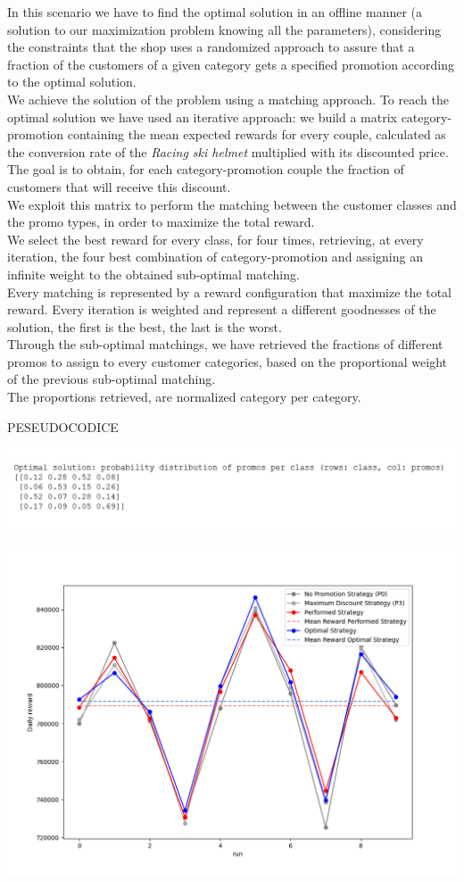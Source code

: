 In this scenario we have to find the optimal solution in an offline manner (a solution to our maximization problem knowing all the parameters), considering the constraints that the shop uses a randomized approach to assure that a fraction of the customers of a given category gets a specified promotion according to the optimal solution.\\
We achieve the solution of the problem using a matching approach. 
To reach the optimal solution we have used an iterative approach: we build a matrix category-promotion containing the mean expected rewards for every couple, calculated as the conversion rate of the \textit{Racing ski helmet} multiplied with its discounted price.
The goal is to obtain, for each category-promotion couple the fraction of customers that will receive this discount.\\
We exploit this matrix to perform the matching between the customer classes and the promo types, in order to maximize the total reward. \\
We select the best reward for every class, for four times, retrieving, at every iteration, the four best combination of category-promotion and assigning an infinite weight to the obtained sub-optimal matching.\\
Every matching is represented by a reward configuration that maximize the total reward. Every iteration is weighted and represent a different goodnesses of the solution, the first is the best, the last is the worst.\\
Through the sub-optimal matchings, we have retrieved the fractions of different promos to assign to every customer categories, based on the proportional weight of the previous sub-optimal matching.\\
The proportions retrieved, are normalized category per category.

PESEUDOCODICE
\begin{center}
	\includegraphics[scale=0.9]{Images/n1_results}
\end{center}
\begin{center}
	\includegraphics[scale=0.7]{Images/n1_chart}
\end{center}





